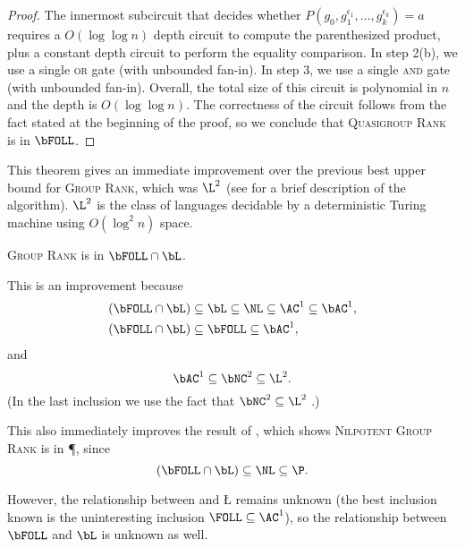 \documentclass{article}
\begin{document}
\begin{proof}
  The innermost subcircuit that decides whether $P(g_0, g_1^{\epsilon_1}, \dotsc, g_k^{\epsilon_k}) = a$ requires a $O(\log \log n)$ depth circuit to compute the parenthesized product, plus a constant depth circuit to perform the equality comparison.
  In step 2(b), we use a single \textsc{or} gate (with unbounded fan-in).
  In step 3, we use a single \textsc{and} gate (with unbounded fan-in).
  Overall, the total size of this circuit is polynomial in $n$ and the depth is $O(\log \log n)$.
  The correctness of the circuit follows from the fact stated at the beginning of the proof, so we conclude that \textsc{Quasigroup Rank} is in $\bFOLL$.
\end{proof}

This theorem gives an immediate improvement over the previous best upper bound for \textsc{Group Rank}, which was $\L^2$ \cite{lsz77} (see \cite[Proposition~3]{at06} for a brief description of the algorithm).
$\L^2$ is the class of languages decidable by a deterministic Turing machine using $O(\log^2 n)$ space.

\begin{corollary}\label{cor:grouprank}
  \textsc{Group Rank} is in $\bFOLL \cap \bL$.
\end{corollary}

This is an improvement because
\begin{align*}
  (\bFOLL \cap \bL) & \subseteq \bL \subseteq \NL \subseteq \AC^1 \subseteq \bAC^1, \\ %
  (\bFOLL \cap \bL) & \subseteq \bFOLL \subseteq \bAC^1, %
\end{align*}
and
$$
\bAC^1 \subseteq \bNC^2 \subseteq \L^2.
$$
(In the last inclusion we use the fact that $\bNC^2 \subseteq \L^2$ \cite[Lemma~3.1]{wolf94}.)

This also immediately improves the result of \cite[Theorem~7]{at06}, which shows \textsc{Nilpotent Group Rank} is in \P, since
$$
(\bFOLL \cap \bL) \subseteq \NL \subseteq \P.
$$

However, the relationship between \FOLL{} and \L{} remains unknown (the best inclusion known is the uninteresting inclusion $\FOLL \subseteq \AC^1$), so the relationship between $\bFOLL$ and $\bL$ is unknown as well.
\end{document}
